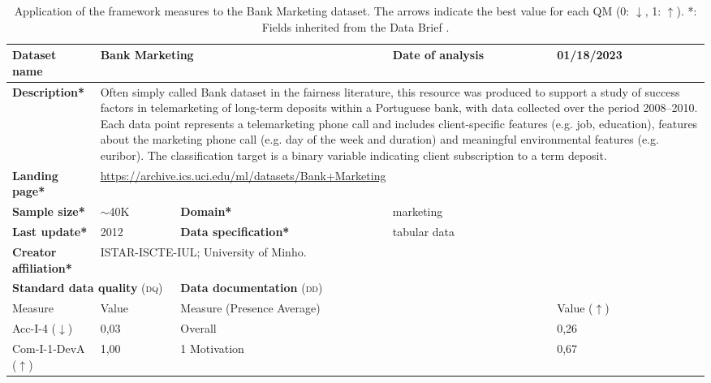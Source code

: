 \begin{table}[h]
    \caption{Application of the framework measures to the Bank Marketing dataset. The arrows indicate the best value for each QM (0: $\downarrow$, 1: $\uparrow$). *: Fields inherited from the Data Brief \cite{fabrisAlgorithmicFairnessDatasets2022}.}
    \label{tab:BankMarketing}
    \begin{tabular}{|p{3cm}|p{1.9cm}p{3cm}p{2.6cm}p{1.6cm}|}
        \hline
        \textbf{Dataset name} & \multicolumn{2}{l|}{Bank Marketing} & \multicolumn{1}{l|}{\textbf{Date of analysis}} & 01/18/2023 \\ \hline
        \textbf{Description*} & \multicolumn{4}{p{10cm}|}{Often simply called Bank dataset in the fairness literature, this resource was produced to support a study of success factors in telemarketing of long-term deposits within a Portuguese bank, with data collected over the period 2008–2010. Each data point represents a telemarketing phone call and includes client-specific features (e.g. job, education), features about the marketing phone call (e.g. day of the week and duration) and meaningful environmental features (e.g. euribor). The classification target is a binary variable indicating client subscription to a term deposit.} \\ \hline
        \textbf{Landing page*} & \multicolumn{4}{l|}{\href{https://archive.ics.uci.edu/ml/datasets/Bank+Marketing}{https://archive.ics.uci.edu/ml/datasets/Bank+Marketing}} \\ \hline
        \textbf{Sample size*} & $\sim$40K & \multicolumn{1}{|l}{\textbf{Domain*}} & \multicolumn{2}{|l|}{marketing}  \\ \hline
        \textbf{Last update*} & 2012 & \multicolumn{1}{|p{3cm}}{\textbf{Data specification*}} & \multicolumn{2}{|l|}{tabular data} \\ \hline
        \textbf{Creator affiliation*} & \multicolumn{4}{l|}{ISTAR-ISCTE-IUL; University of Minho.} \\ \hline\hline
        \multicolumn{2}{|l|}{\textbf{Standard data quality} (\textsc{dq})} & \multicolumn{3}{|l|}{\textbf{Data documentation} (\textsc{dd})}\\ \hline
        Measure & Value & \multicolumn{2}{|l|}{Measure (Presence Average)} & Value ($\uparrow$) \\ \hline
        Acc-I-4 ($\downarrow$) & 0,03\cellcolor[HTML]{FEFBFA} & \multicolumn{2}{|l|}{Overall} & 0,26\cellcolor[HTML]{FCAD96} \\
        Com-I-1-DevA ($\uparrow$) & 1,00\cellcolor[HTML]{FFFFFF} & \multicolumn{2}{|l|}{1 Motivation} & 0,67\cellcolor[HTML]{FEDAD0} \\

\end{tabular}
\end{table}
